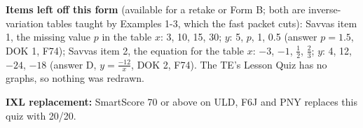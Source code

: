 \documentclass[11pt]{article}
\begin{document}
\textbf{Items left off this form} (available for a retake or Form B; both are inverse-variation tables taught by Examples 1-3, which the fast packet cuts): Savvas item 1, the missing value $p$ in the table $x$: 3, 10, 15, 30; $y$: 5, $p$, 1, 0.5 (answer $p=1.5$, DOK 1, F74); Savvas item 2, the equation for the table $x$: $-3$, $-1$, $\frac12$, $\frac23$; $y$: 4, 12, $-24$, $-18$ (answer D, $y=\frac{-12}{x}$, DOK 2, F74). The TE's Lesson Quiz has no graphs, so nothing was redrawn.

\textbf{IXL replacement:} SmartScore 70 or above on ULD, F6J and PNY replaces this quiz with 20/20.
\end{document}
